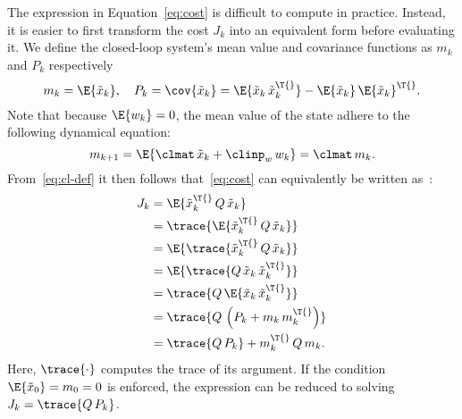 The expression in Equation~\eqref{eq:cost} is difficult to compute in practice.
Instead, it is easier to first transform the cost $J_k$ into an equivalent form before evaluating it.
We define the closed-loop system's mean value and covariance functions as $m_k$ and $P_k$ respectively
%
\begin{equation}%
    \label{eq:cl-def}%
    m_k = \E{\tilde{x}_k}, \quad P_k = \cov{\tilde{x}_k} = \E{\tilde{x}_k\, \tilde{x}_k^\T{}} - \E{\tilde{x}_k}\,\E{\tilde{x}_k}^\T{}.
\end{equation}
%
Note that because $\E{w_k} = 0$, the mean value of the state adhere to the following dynamical equation:
%
\begin{equation}%
    m_{k+1} = \E{\clmat\,\tilde{x}_k + \clinp_w\,w_k} = \clmat\, m_k.
\end{equation}
%
From~\eqref{eq:cl-def} it then follows that~\eqref{eq:cost} can equivalently be written as~\cite{Bates:2011}:
%
\begin{equation}%
    \label{eq:tr-cost}%
    \begin{aligned}
        J_k &= \E{\tilde{x}_k^\T{}\, Q\, \tilde{x}_k} \\
        &= \trace{\E{\tilde{x}_k^\T{}\, Q\, \tilde{x}_k}} \\
        &= \E{\trace{\tilde{x}_k^\T{}\, Q\, \tilde{x}_k}} \\
        &= \E{\trace{Q\, \tilde{x}_k\, \tilde{x}_k^\T{}}} \\
        &= \trace{Q\, \E{\tilde{x}_k\,\tilde{x}_k^\T{}}} \\
        &= \trace{Q\, \left( P_k + m_k\,m_k^\T{} \right)} \\
        &= \trace{Q\, P_k} + m_k^\T{}\, Q\, m_k.
    \end{aligned}
\end{equation}
%
Here, $\trace{\cdot}$ computes the trace of its argument.
If the condition $\E{\tilde{x}_0} = m_0 = 0$ is enforced, the expression can be reduced to solving $J_k = \trace{Q\, P_k}$.

